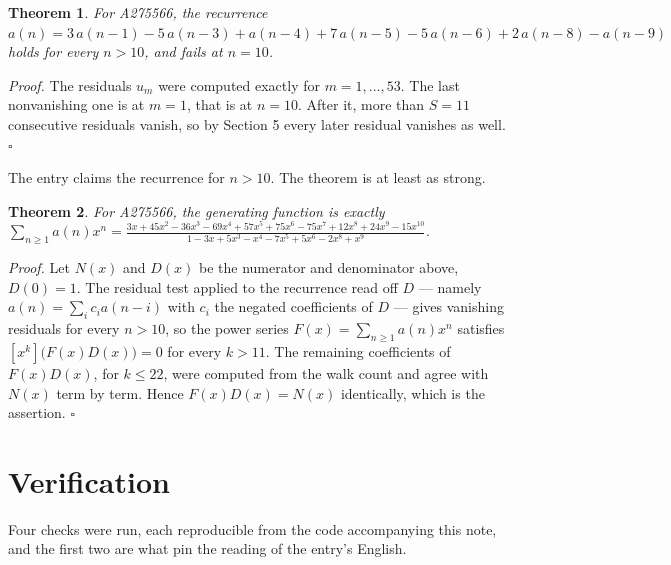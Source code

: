 \documentclass[11pt]{article}
\newtheorem{theorem}{Theorem}
\theoremstyle{definition}
\begin{document}
\begin{theorem} For A275566, the recurrence $a(n) = 3\,a(n-1) - 5\,a(n-3) + a(n-4) + 7\,a(n-5) - 5\,a(n-6) + 2\,a(n-8) - a(n-9)$ holds for every $n > 10$, and fails at $n = 10$.\end{theorem}

{\itshape Proof.} The residuals $u_m$ were computed exactly for $m = 1,\dots,53$. The last nonvanishing one is at $m = 1$, that is at $n = 10$. After it, more than $S = 11$ consecutive residuals vanish, so by Section 5 every later residual vanishes as well. $\square$

The entry claims the recurrence for $n > 10$. The theorem is at least as strong.

\begin{theorem} For A275566, the generating function is exactly $\sum_{n\ge 1} a(n)x^n = \frac{3x + 45x^{2} - 36x^{3} - 69x^{4} + 57x^{5} + 75x^{6} - 75x^{7} + 12x^{8} + 24x^{9} - 15x^{10}}{1 - 3x + 5x^{3} - x^{4} - 7x^{5} + 5x^{6} - 2x^{8} + x^{9}}$.\end{theorem}

{\itshape Proof.} Let $N(x)$ and $D(x)$ be the numerator and denominator above, $D(0)=1$. The residual test applied to the recurrence read off $D$ --- namely $a(n) = \sum_i c_i a(n-i)$ with $c_i$ the negated coefficients of $D$ --- gives vanishing residuals for every $n > 10$, so the power series $F(x)=\sum_{n\ge 1}a(n)x^n$ satisfies $[x^k]\bigl(F(x)D(x)\bigr) = 0$ for every $k > 11$. The remaining coefficients of $F(x)D(x)$, for $k \le 22$, were computed from the walk count and agree with $N(x)$ term by term. Hence $F(x)D(x) = N(x)$ identically, which is the assertion. $\square$

\section{Verification}

Four checks were run, each reproducible from the code accompanying this note, and the first two are what pin the reading of the entry's English.
\end{document}

